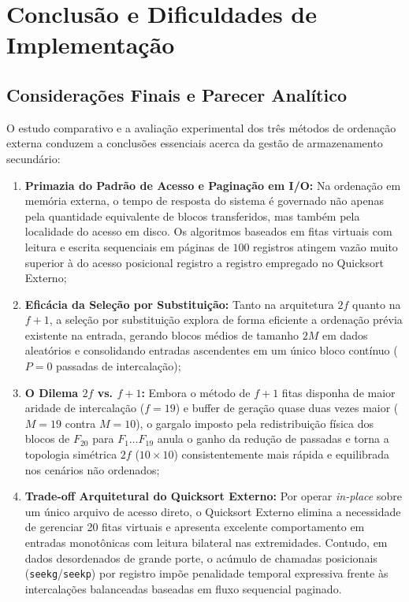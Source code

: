 \documentclass[12pt,a4paper]{article}
\begin{document}
\section{Conclusão e Dificuldades de Implementação}
\label{sec:conclusao}

\subsection{Considerações Finais e Parecer Analítico}
O estudo comparativo e a avaliação experimental dos três métodos de ordenação externa conduzem a conclusões essenciais acerca da gestão de armazenamento secundário:
\begin{enumerate}
    \item \textbf{Primazia do Padrão de Acesso e Paginação em I/O:} Na ordenação em memória externa, o tempo de resposta do sistema é governado não apenas pela quantidade equivalente de blocos transferidos, mas também pela localidade do acesso em disco. Os algoritmos baseados em fitas virtuais com leitura e escrita sequenciais em páginas de $100$ registros atingem vazão muito superior à do acesso posicional registro a registro empregado no Quicksort Externo;
    \item \textbf{Eficácia da Seleção por Substituição:} Tanto na arquitetura $2f$ quanto na $f+1$, a seleção por substituição explora de forma eficiente a ordenação prévia existente na entrada, gerando blocos médios de tamanho $2M$ em dados aleatórios e consolidando entradas ascendentes em um único bloco contínuo ($P = 0$ passadas de intercalação);
    \item \textbf{O Dilema $2f$ vs. $f+1$:} Embora o método de $f+1$ fitas disponha de maior aridade de intercalação ($f = 19$) e buffer de geração quase duas vezes maior ($M = 19$ contra $M = 10$), o gargalo imposto pela redistribuição física dos blocos de $F_{20}$ para $F_1 \dots F_{19}$ anula o ganho da redução de passadas e torna a topologia simétrica $2f$ ($10 \times 10$) consistentemente mais rápida e equilibrada nos cenários não ordenados;
    \item \textbf{Trade-off Arquitetural do Quicksort Externo:} Por operar \textit{in-place} sobre um único arquivo de acesso direto, o Quicksort Externo elimina a necessidade de gerenciar 20 fitas virtuais e apresenta excelente comportamento em entradas monotônicas com leitura bilateral nas extremidades. Contudo, em dados desordenados de grande porte, o acúmulo de chamadas posicionais (\texttt{seekg}/\texttt{seekp}) por registro impõe penalidade temporal expressiva frente às intercalações balanceadas baseadas em fluxo sequencial paginado.
\end{enumerate}
\end{document}
